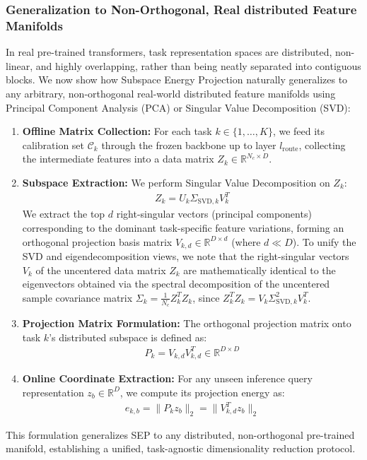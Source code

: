 \subsubsection{Generalization to Non-Orthogonal, Real distributed Feature Manifolds}
In real pre-trained transformers, task representation spaces are distributed, non-linear, and highly overlapping, rather than being neatly separated into contiguous blocks. We now show how Subspace Energy Projection naturally generalizes to any arbitrary, non-orthogonal real-world distributed feature manifolds using Principal Component Analysis (PCA) or Singular Value Decomposition (SVD):
\begin{enumerate}
    \item \textbf{Offline Matrix Collection:} For each task $k \in \{1, \dots, K\}$, we feed its calibration set $\mathcal{C}_k$ through the frozen backbone up to layer $l_{\text{route}}$, collecting the intermediate features into a data matrix $Z_k \in \mathbb{R}^{N_c \times D}$.
    \item \textbf{Subspace Extraction:} We perform Singular Value Decomposition on $Z_k$:
    \begin{align}
        Z_k = U_k \Sigma_{\text{SVD}, k} V_k^T
    \end{align}
    We extract the top $d$ right-singular vectors (principal components) corresponding to the dominant task-specific feature variations, forming an orthogonal projection basis matrix $V_{k, d} \in \mathbb{R}^{D \times d}$ (where $d \ll D$). To unify the SVD and eigendecomposition views, we note that the right-singular vectors $V_k$ of the uncentered data matrix $Z_k$ are mathematically identical to the eigenvectors obtained via the spectral decomposition of the uncentered sample covariance matrix $\Sigma_k = \frac{1}{N_c} Z_k^T Z_k$, since $Z_k^T Z_k = V_k \Sigma_{\text{SVD}, k}^2 V_k^T$.
    \item \textbf{Projection Matrix Formulation:} The orthogonal projection matrix onto task $k$'s distributed subspace is defined as:
    \begin{align}
        P_k = V_{k, d} V_{k, d}^T \in \mathbb{R}^{D \times D}
    \end{align}
    \item \textbf{Online Coordinate Extraction:} For any unseen inference query representation $z_b \in \mathbb{R}^D$, we compute its projection energy as:
    \begin{align}
        e_{k, b} = \|P_k z_b\|_2 = \|V_{k, d}^T z_b\|_2
    \end{align}
\end{enumerate}
This formulation generalizes SEP to any distributed, non-orthogonal pre-trained manifold, establishing a unified, task-agnostic dimensionality reduction protocol. 

